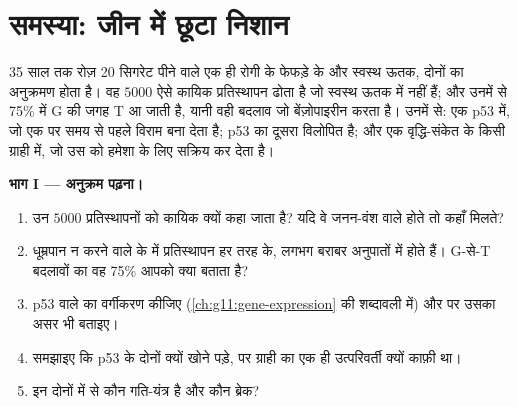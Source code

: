 \section{समस्या: जीन में छूटा निशान}

\begin{problem}
\label{pb:g11:cancer:1}
35 साल तक रोज़ 20 सिगरेट पीने वाले एक ही रोगी के फेफड़े के  और स्वस्थ
ऊतक, दोनों का अनुक्रमण होता है। वह  $\num{5000}$ ऐसे कायिक
प्रतिस्थापन ढोता है जो स्वस्थ ऊतक में नहीं हैं; और उनमें से 75\% में G की
जगह T आ जाती है, यानी वही बदलाव जो बेंज़ोपाइरीन करता है। उनमें से: एक p53
 में, जो एक  पर समय से पहले विराम बना देता है; p53 का दूसरा
 विलोपित है; और एक वृद्धि-संकेत के किसी ग्राही  में, जो उस
 को हमेशा के लिए सक्रिय कर देता है।

\medskip
\noindent\textbf{भाग I --- अनुक्रम पढ़ना।}
\begin{enumerate}
  \item उन $\num{5000}$ प्रतिस्थापनों को कायिक क्यों कहा जाता है? यदि वे
        जनन-वंश वाले होते तो कहाँ मिलते?
  \item धूम्रपान न करने वाले के  में प्रतिस्थापन हर तरह के, लगभग
        बराबर अनुपातों में होते हैं। G-से-T बदलावों का वह 75\% आपको क्या
        बताता है?
  \item p53 वाले  का वर्गीकरण कीजिए
        (\cref{ch:g11:gene-expression} की शब्दावली में) और  पर
        उसका असर भी बताइए।
  \item समझाइए कि p53 के दोनों  क्यों खोने पड़े, पर ग्राही  का
        एक ही उत्परिवर्ती  क्यों काफ़ी था।
  \item इन दोनों  में से कौन गति-यंत्र है और कौन ब्रेक?
\end{enumerate}


\end{problem}
